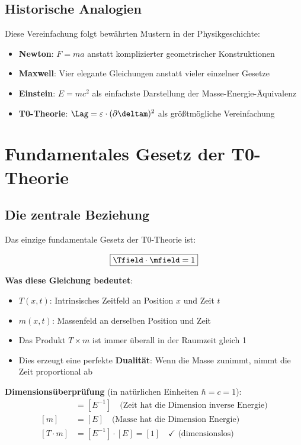 	\subsection{Historische Analogien}
	
	Diese Vereinfachung folgt bewährten Mustern in der Physikgeschichte:
	\begin{itemize}
		\item \textbf{Newton}: $F = ma$ anstatt komplizierter geometrischer Konstruktionen
		\item \textbf{Maxwell}: Vier elegante Gleichungen anstatt vieler einzelner Gesetze
		\item \textbf{Einstein}: $E = mc^2$ als einfachste Darstellung der Masse-Energie-Äquivalenz
		\item \textbf{T0-Theorie}: $\Lag = \varepsilon \cdot (\partial \deltam)^2$ als größtmögliche Vereinfachung
	\end{itemize}
	
	\section{Fundamentales Gesetz der T0-Theorie}
	
	\subsection{Die zentrale Beziehung}
	
	Das einzige fundamentale Gesetz der T0-Theorie ist:
	
	\begin{equation}
		\boxed{\Tfield \cdot \mfield = 1}
		\label{eq:fundamental_law}
	\end{equation}
	
	\textbf{Was diese Gleichung bedeutet}:
	\begin{itemize}
		\item $T(x,t)$: Intrinsisches Zeitfeld an Position $x$ und Zeit $t$
		\item $m(x,t)$: Massenfeld an derselben Position und Zeit
		\item Das Produkt $T \times m$ ist immer überall in der Raumzeit gleich 1
		\item Dies erzeugt eine perfekte \textbf{Dualität}: Wenn die Masse zunimmt, nimmt die Zeit proportional ab
	\end{itemize}
	
	\textbf{Dimensionsüberprüfung} (in natürlichen Einheiten $\hbar = c = 1$):
	\begin{align}
		[T] &= [E^{-1}] \quad \text{(Zeit hat die Dimension inverse Energie)} \\
		[m] &= [E] \quad \text{(Masse hat die Dimension Energie)} \\
		[T \cdot m] &= [E^{-1}] \cdot [E] = [1] \quad \checkmark \text{ (dimensionslos)}
	\end{align}
	
